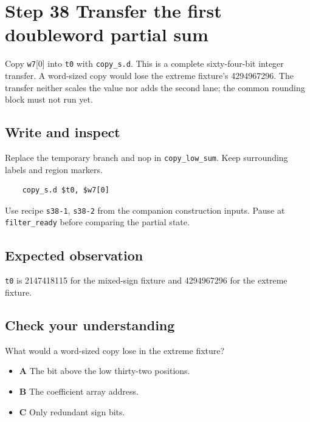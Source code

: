 \section{Step 38 Transfer the first doubleword partial sum}\label{fir-s38}

Copy \texttt{w7}[0] into \texttt{t0} with \texttt{copy\_s.d}. This is a complete sixty-four-bit integer transfer. A word-sized copy would lose the extreme fixture’s 4294967296. The transfer neither scales the value nor adds the second lane; the common rounding block must not run yet.

\subsection{Write and inspect}
Replace the temporary branch and nop in \texttt{copy\_low\_sum}. Keep surrounding labels and region markers.

\begin{verbatim}
    copy_s.d $t0, $w7[0]
\end{verbatim}
Use recipe \texttt{s38-1}, \texttt{s38-2} from the companion construction inputs. Pause at \texttt{filter\_ready} before comparing the partial state.

\subsection{Expected observation}
\texttt{t0} is 2147418115 for the mixed-sign fixture and 4294967296 for the extreme fixture.

\subsection{Check your understanding}
What would a word-sized copy lose in the extreme fixture?

\begin{itemize}
  \item \textbf{A} The bit above the low thirty-two positions.
  \item \textbf{B} The coefficient array address.
  \item \textbf{C} Only redundant sign bits.
\end{itemize}
